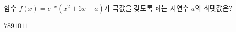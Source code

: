 함수 $f(x)=e^{-x}(x^2+6x+a)$가 극값을 갖도록 하는 자연수 $a$의 최댓값은?
\begin{choices32}{$7$}{$8$}{$9$}{$10$}{$11$}\end{choices32}
